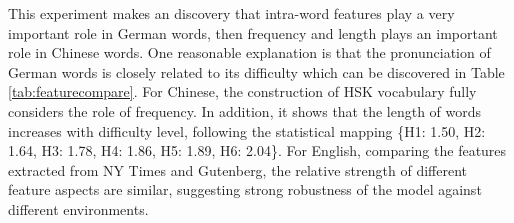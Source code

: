 This experiment makes an discovery that intra-word features play a very important role in German words, 
then frequency and length plays an important role in Chinese words.
One reasonable explanation is that the pronunciation of German words is closely related to its difficulty which can be 
discovered in Table \ref{tab:featurecompare}.
For Chinese, the construction of HSK vocabulary fully considers the role of frequency.
In addition, it shows that the length of words increases with difficulty level, following the statistical mapping 
\{H1: 1.50, H2: 1.64, H3: 1.78, H4: 1.86, H5: 1.89, H6: 2.04\}.
For English, 
comparing the features extracted from NY Times and Gutenberg, the relative strength of different feature aspects are similar, suggesting strong robustness of the model against different environments.


